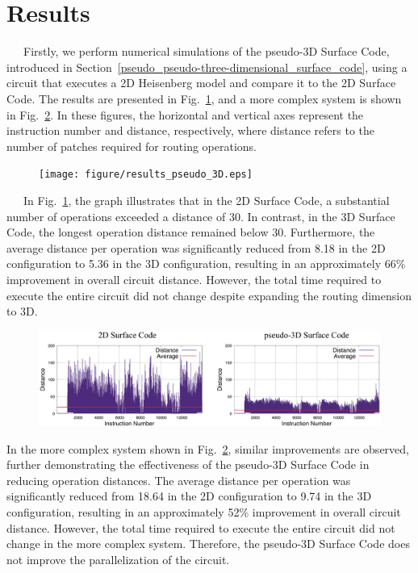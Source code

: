\documentclass[a4paper,11pt]{ltjsarticle}
\begin{document}
\section{Results}\label{results}{
    \ \ \ Firstly, we perform numerical simulations of the pseudo-3D Surface Code, introduced in Section~\ref{pseudo_pseudo-three-dimensional_surface_code}, using a circuit that executes a 2D Heisenberg model and compare it to the 2D Surface Code. The results are presented in Fig.~\ref{results_of_pseudo_3D}, and a more complex system is shown in Fig.~\ref{results_of_pseudo_3D_1}. In these figures, the horizontal and vertical axes represent the instruction number and distance, respectively, where distance refers to the number of patches required for routing operations.\\

    \begin{figure}[h]
        \centering
        \texttt{[image: figure/results\_pseudo\_3D.eps]}
        \vspace{-20pt}\caption{}
        \label{results_of_pseudo_3D}
    \end{figure}

    \ \ \ In Fig.~\ref{results_of_pseudo_3D}, the graph illustrates that in the 2D Surface Code, a substantial number of operations exceeded a distance of 30. In contrast, in the 3D Surface Code, the longest operation distance remained below 30. Furthermore, the average distance per operation was significantly reduced from 8.18 in the 2D configuration to 5.36 in the 3D configuration, resulting in an approximately 66\% improvement in overall circuit distance. However, the total time required to execute the entire circuit did not change despite expanding the routing dimension to 3D.

    \begin{figure}[h]
        \centering
        \includegraphics[scale=0.5]{figure/results_pseudo_3D_1.eps}
        \vspace{-20pt}\caption{}
        \label{results_of_pseudo_3D_1}
    \end{figure}

    In the more complex system shown in Fig.~\ref{results_of_pseudo_3D_1}, similar improvements are observed, further demonstrating the effectiveness of the pseudo-3D Surface Code in reducing operation distances. The average distance per operation was significantly reduced from 18.64 in the 2D configuration to 9.74 in the 3D configuration, resulting in an approximately 52\% improvement in overall circuit distance. However, the total time required to execute the entire circuit did not change in the more complex system. Therefore, the pseudo-3D Surface Code does not improve the parallelization of the circuit.
    \clearpage

}
\end{document}
